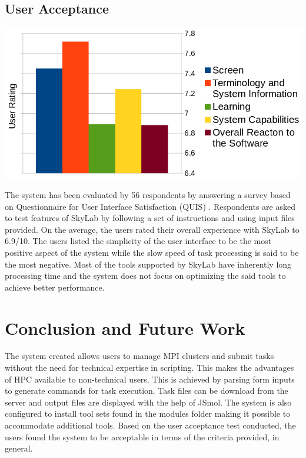 \documentclass[journal]{./IEEE/IEEEtran}
\begin{document}
	\subsection{User Acceptance}
	\begin{center}			
			\includegraphics[scale=0.32]{./images/uat_graph_1.png}			
	\end{center}
	The system has been evaluated by 56 respondents by answering a survey based on Questionnaire for User Interface Satisfaction (QUIS) \cite{chin1988development}. Respondents are asked to test features of SkyLab by following a set of instructions and using input files provided. On the average, the users rated their overall experience with SkyLab to 6.9/10. The users listed the simplicity of the user interface to be the most positive aspect of the system while the slow speed of task processing is said to be the most negative. Most of the tools supported by SkyLab have inherently long processing time and the system does not focus on optimizing the said tools to achieve better performance. 

	
\section{Conclusion and Future Work}
The system created allows users to manage MPI clusters and submit tasks without the need for technical expertise in scripting. This makes the advantages of HPC available to non-technical users. This is achieved by parsing form inputs to generate commands for task execution. Task files can be download from the server and output files are displayed with the help of JSmol\cite{IJCH:IJCH201300024}. The system is also configured to install tool sets found in the modules folder making it possible to accommodate additional tools. Based on the user acceptance test conducted, the users found the system to be acceptable in terms of the criteria provided, in general. 
\end{document}
